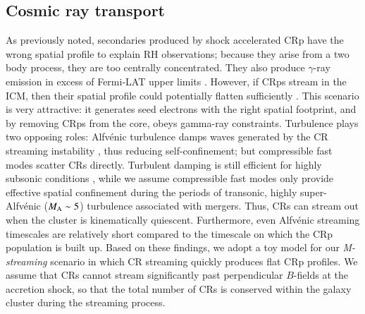 \documentclass[useAMS,usenatbib]{mn2e}
\newcommand{\Mstream}{{\it M-streaming}\xspace}
\begin{document}
\subsection{Cosmic ray transport}
As previously noted, secondaries produced by shock accelerated CRp
have the wrong spatial profile to explain RH observations; because
they arise from a two body process, they are too centrally
concentrated. They also produce $\gamma$-ray emission in excess of
Fermi-LAT upper limits
\citep{2012ApJ...757..123A,brunetti12,2014ApJ...787...18A}. However,
if CRps stream in the ICM, then their spatial profile could
potentially flatten sufficiently \citep{ensslin11,wiener13}. This
scenario is very attractive: it generates seed electrons with the
right spatial footprint, and by removing CRps from the core, obeys
gamma-ray constraints. Turbulence plays two opposing roles:
Alfv{\'e}nic turbulence damps waves generated by the CR streaming
instability \citep{yan02,farmer04}, thus reducing self-confinement;
but compressible fast modes scatter CRs directly. Turbulent damping is
still efficient for highly subsonic conditions \citep{wiener13}, while
we assume compressible fast modes only provide effective spatial
confinement during the periods of transonic, highly super-Alfv{\'e}nic
($M_{\rm A} \sim 5$) turbulence associated with mergers. Thus, CRs can
stream out when the cluster is kinematically quiescent. Furthermore,
even Alfv{\'e}nic streaming timescales are relatively short
\cite[$\sim 0.1-0.5$ Gyr;][]{wiener13} compared to the timescale on
which the CRp population is built up. Based on these findings, we
adopt a toy model for our \Mstream scenario in which CR streaming
quickly produces flat CRp profiles. We assume that CRs cannot stream
significantly past perpendicular $B$-fields at the accretion shock, so
that the total number of CRs is conserved within the galaxy cluster
during the streaming process.
\end{document}
